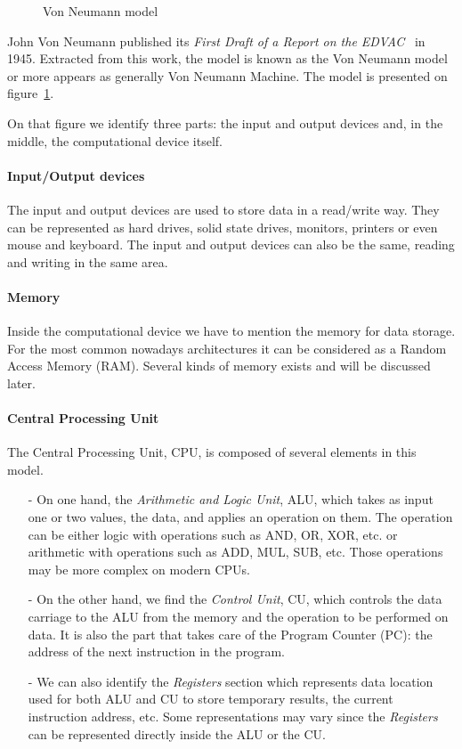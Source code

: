 \begin{figure}
\centering 

\caption{Von Neumann model}
\label{fig:1_HPC:von_neumann_model}
\end{figure}

John Von Neumann published its \textit{First Draft of a Report on the EDVAC}~\cite{von1993first} in 1945. 
Extracted from this work, the model is known as the Von Neumann model or more appears as generally Von Neumann Machine. 
The model is presented on figure~\ref{fig:1_HPC:von_neumann_model}.

On that figure we identify three parts: the input and output devices and, in the middle, the computational device itself. 
\paragraph{Input/Output devices}
The input and output devices are used to store data in a read/write way. 
They can be represented as hard drives, solid state drives, monitors, printers or even mouse and keyboard.
The input and output devices can also be the same, reading and writing in the same area.\\

\paragraph{Memory} Inside the computational device we have to mention the memory for data storage.
For the most common nowadays architectures it can be considered as a Random Access Memory (RAM). 
Several kinds of memory exists and will be discussed later. 

\paragraph{Central Processing Unit}
The Central Processing Unit, CPU, is composed of several elements in this model. 
\begin{itemize}[noitemsep,nolistsep]
\item[-] On one hand, the \textit{Arithmetic and Logic Unit}, ALU, which takes as input one or two values, the data, and applies an operation on them. 
The operation can be either logic with operations such as AND, OR, XOR, etc. or arithmetic with operations such as ADD, MUL, SUB, etc. 
Those operations may be more complex on modern CPUs. 
\item[-] On the other hand, we find the \textit{Control Unit}, CU, which controls the data carriage to the ALU from the memory and the operation to be performed on data.
It is also the part that takes care of the Program Counter (PC): the address of the next instruction in the program. 
\item[-] We can also identify the \textit{Registers} section which represents data location used for both ALU and CU to store temporary results, the current instruction address, etc. 
Some representations may vary since the \textit{Registers} can be represented directly inside the ALU or the CU. 
\end{itemize}
